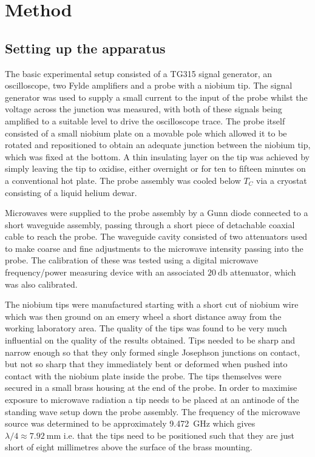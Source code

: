 \documentclass[11pt]{article}
\begin{document}
\section{Method}
\subsection{Setting up the apparatus}
The basic experimental setup consisted of a TG315 signal generator, an oscilloscope, two Fylde amplifiers and a probe with a niobium tip. The signal generator was used to supply a small current to the input of the probe whilst the voltage across the junction was measured, with both of these signals being amplified to a suitable level to drive the oscilloscope trace. The probe itself consisted of a small niobium plate on a movable pole which allowed it to be rotated and repositioned to obtain an adequate junction between the niobium tip, which was fixed at the bottom. A thin insulating layer on the tip was achieved by simply leaving the tip to oxidise, either overnight or for ten to fifteen minutes on a conventional hot plate. The probe assembly was cooled below $T_C$ via a cryostat consisting of a liquid helium dewar.

Microwaves were supplied to the probe assembly by a Gunn diode connected to a short waveguide assembly, passing through a short piece of detachable coaxial cable to reach the probe. The waveguide cavity consisted of two attenuators used to make coarse and fine adjustments to the microwave intensity passing into the probe. The calibration of these was tested using a digital microwave frequency/power measuring device with an associated $\SI{20}{\decibel}$ attenuator, which was also calibrated.

The niobium tips were manufactured starting with a short cut of niobium wire which was then ground on an emery wheel a short distance away from the working laboratory area. The quality of the tips was found to be very much influential on the quality of the results obtained. Tips needed to be sharp and narrow enough so that they only formed single Josephson junctions on contact, but not so sharp that they immediately bent or deformed when pushed into contact with the niobium plate inside the probe. The tips themselves were secured in a small brass housing at the end of the probe. In order to maximise exposure to microwave radiation a tip needs to be placed at an antinode of the standing wave setup down the probe assembly. The frequency of the microwave source was determined to be approximately \SI{9.472}{\giga\hertz} which gives $\lambda/4 \approx \SI{7.92}{\milli\metre}$ i.e. that the tips need to be positioned such that they are just short of eight millimetres above the surface of the brass mounting.
\end{document}
